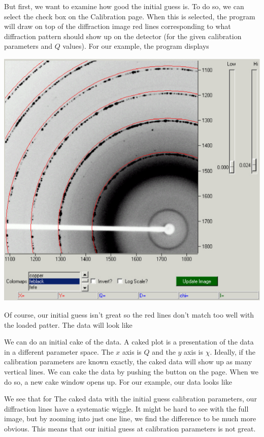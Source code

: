 But first, we want to examine how good the initial guess 
is. To do so, we can select the 
check box on the Calibration page. When this is selected, 
the program will draw
on top of the diffraction image red lines corresponding
to what diffraction pattern should show up on the
detector (for the given calibration parameters and $Q$
values). For our example, the program displays

\includegraphics[scale=.75]{figures/bad_calibration_diffraction_image.eps}

Of course, our initial guess isn't
great so the red lines don't match too well with
the loaded patter. The data will look like

We can do an initial cake of the data. A caked plot
is a presentation of the data in a different parameter 
space.  The $x$ axis is $Q$ and the $y$ axis is $\chi$. 
Ideally, if the calibration parameters are known exactly, 
the caked data will show up as many vertical lines. 
We can cake the data by pushing the 
button on the  page. When we do so, a new cake 
window opens up. For our example, our data looks like

We see that for The caked data with the initial guess 
calibration parameters, our diffraction lines
have a systematic wiggle. It might be hard to see 
with the full image, but by zooming into just one
line, we find the difference to be much more obvious.
This means that our initial guess at 
calibration parameters is not great.

